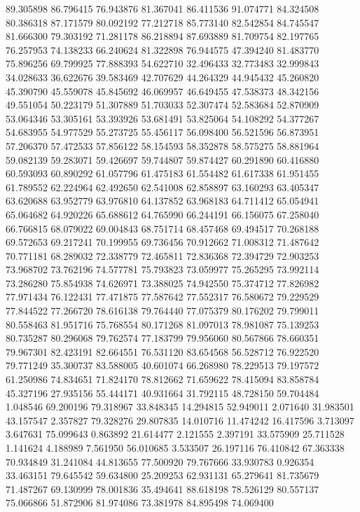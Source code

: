89.305898
86.796415
76.943876
81.367041
86.411536
91.074771
84.324508
80.386318
87.171579
80.092192
77.212718
85.773140
82.542854
84.745547
81.666300
79.303192
71.281178
86.218894
87.693889
81.709754
82.197765
76.257953
74.138233
66.240624
81.322898
76.944575
47.394240
81.483770
75.896256
69.799925
77.888393
54.622710
32.496433
32.773483
32.999843
34.028633
36.622676
39.583469
42.707629
44.264329
44.945432
45.260820
45.390790
45.559078
45.845692
46.069957
46.649455
47.538373
48.342156
49.551054
50.223179
51.307889
51.703033
52.307474
52.583684
52.870909
53.064346
53.305161
53.393926
53.681491
53.825064
54.108292
54.377267
54.683955
54.977529
55.273725
55.456117
56.098400
56.521596
56.873951
57.206370
57.472533
57.856122
58.154593
58.352878
58.575275
58.881964
59.082139
59.283071
59.426697
59.744807
59.874427
60.291890
60.416880
60.593093
60.890292
61.057796
61.475183
61.554482
61.617338
61.951455
61.789552
62.224964
62.492650
62.541008
62.858897
63.160293
63.405347
63.620688
63.952779
63.976810
64.137852
63.968183
64.711412
65.054941
65.064682
64.920226
65.688612
64.765990
66.244191
66.156075
67.258040
66.766815
68.079022
69.004843
68.751714
68.457468
69.494517
70.268188
69.572653
69.217241
70.199955
69.736456
70.912662
71.008312
71.487642
70.771181
68.289032
72.338779
72.465811
72.836368
72.394729
72.903253
73.968702
73.762196
74.577781
75.793823
73.059977
75.265295
73.992114
73.286280
75.854938
74.626971
73.388025
74.942550
75.374712
77.826982
77.971434
76.122431
77.471875
77.587642
77.552317
76.580672
79.229529
77.844522
77.266720
78.616138
79.764440
77.075379
80.176202
79.799011
80.558463
81.951716
75.768554
80.171268
81.097013
78.981087
75.139253
80.735287
80.296068
79.762574
77.183799
79.956060
80.567866
78.660351
79.967301
82.423191
82.664551
76.531120
83.654568
56.528712
76.922520
79.771249
35.300737
83.588005
40.601074
66.268980
78.229513
79.197572
61.250986
74.834651
71.824170
78.812662
71.659622
78.415094
83.858784
45.327196
27.935156
55.444171
40.931664
31.792115
48.728150
59.704484
1.048546
69.200196
79.318967
33.848345
14.294815
52.949011
2.071640
31.983501
43.157547
2.357827
79.328276
29.807835
14.010716
11.474242
16.417596
3.713097
3.647631
75.099643
0.863892
21.614477
2.121555
2.397191
33.575909
25.711528
1.141624
4.188989
7.561950
56.010685
3.533507
26.197116
76.410842
67.363338
70.934849
31.241084
44.813655
77.500920
79.767666
33.930783
0.926354
33.463151
79.645542
59.634800
25.209253
62.931131
65.279641
81.735679
71.487267
69.130999
78.001836
35.494641
88.618198
78.526129
80.557137
75.066866
51.872906
81.974086
73.381978
84.895498
74.069400
